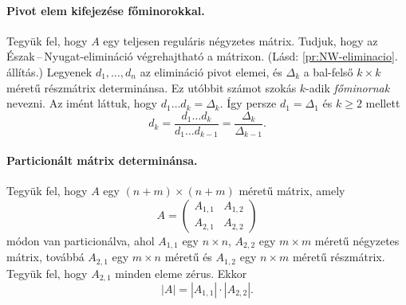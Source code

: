 \documentclass[a4paper, showtrims]{memoir}
\theoremstyle{plain}
\theoremstyle{remark}
\theoremstyle{definition}
\begin{document}
\paragraph{Pivot elem kifejezése főminorokkal.}\label{par:pivot-fominor}
Tegyük fel, hogy $A$ egy teljesen reguláris négyzetes mátrix.
Tudjuk, hogy az Észak\,--\,Nyugat-elimináció végrehajtható a mátrixon. (Lásd: \ref{pr:NW-eliminacio}. állítás.)
Legyenek $d_1,\ldots,d_n$ az elimináció pivot elemei, 
és $\Delta_k$ a bal-felső $k\times k$ méretű részmátrix determinánsa.
Ez utóbbit számot szokás $k$-adik \emph{főminornak} nevezni.
Az imént láttuk, hogy $d_1\ldots d_k=\Delta_k.$
Így persze $d_1=\Delta_1$ és $k\geq 2$ mellett 
\[
    d_k=\frac{d_1\ldots d_k}{d_1\ldots d_{k-1}}=\frac{\Delta_k}{\Delta_{k-1}}.
\]
\paragraph{Particionált mátrix determinánsa.}\label{par:particionalt}
Tegyük fel, hogy $A$ egy $(n+m)\times(n+m)$ méretű mátrix,
amely
\[
	A
	=
	\begin{pmatrix}
		A_{1,1} & A_{1,2} \\
		A_{2,1} & A_{2,2}
	\end{pmatrix}
\]
módon van particionálva, ahol $A_{1,1}$ egy $n\times n$, $A_{2,2}$ egy $m\times m$ méretű négyzetes mátrix,
továbbá $A_{2,1}$ egy $m\times n$ méretű és $A_{1,2}$ egy $n\times m$ méretű részmátrix.
Tegyük fel, hogy $A_{2,1}$ minden eleme zérus.
Ekkor
\[
	|A|
	=
	|A_{1,1}|\cdot |A_{2,2}|.
\]
\end{document}
